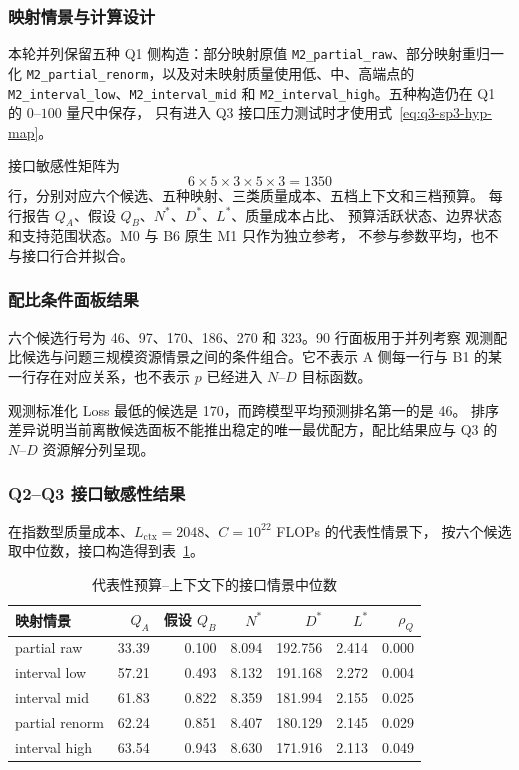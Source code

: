 \subsubsection{映射情景与计算设计}

本轮并列保留五种 Q1 侧构造：部分映射原值
\texttt{M2\_partial\_raw}、部分映射重归一化
\texttt{M2\_partial\_renorm}，以及对未映射质量使用低、中、高端点的
\texttt{M2\_interval\_low}、\texttt{M2\_interval\_mid} 和
\texttt{M2\_interval\_high}。五种构造仍在 Q1 的 $0$--$100$ 量尺中保存，
只有进入 Q3 接口压力测试时才使用式~\eqref{eq:q3-sp3-hyp-map}。

接口敏感性矩阵为
\begin{equation}
  6\times5\times3\times5\times3=1350
\end{equation}
行，分别对应六个候选、五种映射、三类质量成本、五档上下文和三档预算。
每行报告 $Q_A$、假设 $Q_B$、$N^*$、$D^*$、$L^*$、质量成本占比、
预算活跃状态、边界状态和支持范围状态。M0 与 B6 原生 M1 只作为独立参考，
不参与参数平均，也不与接口行合并拟合。

\subsubsection{配比条件面板结果}

六个候选行号为 46、97、170、186、270 和 323。90 行面板用于并列考察
观测配比候选与问题三规模资源情景之间的条件组合。它不表示 A 侧每一行与
B1 的某一行存在对应关系，也不表示 $p$ 已经进入 $N$--$D$ 目标函数。

观测标准化 Loss 最低的候选是 170，而跨模型平均预测排名第一的是 46。
排序差异说明当前离散候选面板不能推出稳定的唯一最优配方，配比结果应与
Q3 的 $N$--$D$ 资源解分列呈现。

\subsubsection{Q2--Q3 接口敏感性结果}

在指数型质量成本、$L_{\mathrm{ctx}}=2048$、$C=10^{22}$ FLOPs 的代表性情景下，
按六个候选取中位数，接口构造得到表~\ref{tab:q3-sp3-representative}。

\begin{table}[htbp]
  \centering
  \caption{代表性预算--上下文下的接口情景中位数}
  \label{tab:q3-sp3-representative}
  \small
  \begin{tabular}{lrrrrrr}
    \toprule
    映射情景 & $Q_A$ & 假设 $Q_B$ & $N^*$ & $D^*$ & $L^*$ & $\rho_Q$ \\
    \midrule
    partial raw & 33.39 & 0.100 & 8.094 & 192.756 & 2.414 & 0.000 \\
    interval low & 57.21 & 0.493 & 8.132 & 191.168 & 2.272 & 0.004 \\
    interval mid & 61.83 & 0.822 & 8.359 & 181.994 & 2.155 & 0.025 \\
    partial renorm & 62.24 & 0.851 & 8.407 & 180.129 & 2.145 & 0.029 \\
    interval high & 63.54 & 0.943 & 8.630 & 171.916 & 2.113 & 0.049 \\
    \bottomrule
  \end{tabular}
\end{table}

